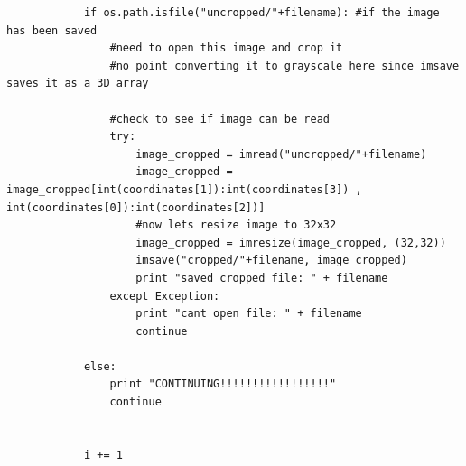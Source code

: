 \documentclass{article}
\begin{document}
\begin{lstlisting}
            if os.path.isfile("uncropped/"+filename): #if the image has been saved
                #need to open this image and crop it
                #no point converting it to grayscale here since imsave saves it as a 3D array
                
                #check to see if image can be read
                try:
                    image_cropped = imread("uncropped/"+filename)
                    image_cropped = image_cropped[int(coordinates[1]):int(coordinates[3]) , int(coordinates[0]):int(coordinates[2])]
                    #now lets resize image to 32x32
                    image_cropped = imresize(image_cropped, (32,32))
                    imsave("cropped/"+filename, image_cropped)
                    print "saved cropped file: " + filename
                except Exception:
                    print "cant open file: " + filename
                    continue 
    
            else:
                print "CONTINUING!!!!!!!!!!!!!!!!!"
                continue

            
            i += 1
    
    
\end{lstlisting}
\end{document}
